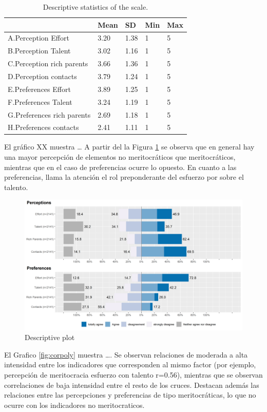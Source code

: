 \documentclass[
]{article}
\begin{document}
\begin{table}[!h]

\caption{\label{tab:desc01}Descriptive statistics of the scale.}
\centering
\fontsize{10}{12}\selectfont
\begin{tabular}[t]{lllll}
\toprule
  & Mean & SD & Min & Max\\
\midrule
A.Perception Effort & 3.20 & 1.38 & 1 & 5\\
B.Perception Talent & 3.02 & 1.16 & 1 & 5\\
C.Perception rich parents & 3.66 & 1.36 & 1 & 5\\
D.Perception contacts & 3.79 & 1.24 & 1 & 5\\
E.Preferences Effort & 3.89 & 1.25 & 1 & 5\\
F.Preferences Talent & 3.24 & 1.19 & 1 & 5\\
G.Preferences rich parents & 2.69 & 1.18 & 1 & 5\\
H.Preferences contacts & 2.41 & 1.11 & 1 & 5\\
\bottomrule
\end{tabular}
\end{table}

El gráfico XX muestra \ldots{}
A partir del la Figura \ref{fig:plotlikert} se observa que en general hay una mayor percepción de elementos no meritocráticos que meritocráticos, mientras que en el caso de preferencias ocurre lo opuesto. En cuanto a las preferencias, llama la atención el rol preponderante del esfuerzo por sobre el talento.

\begin{figure}[H]

{\centering \includegraphics[width=0.75\linewidth]{../output/images/plotlikert} 

}

\caption{Descriptive plot}\label{fig:plotlikert}
\end{figure}

El Grafico \ref{fig:corpoly} muestra \ldots.
Se observan relaciones de moderada a alta intensidad entre los indicadores que corresponden al mismo factor (por ejemplo, percepción de meritocracia esfuerzo con talento r=0.56), mientras que se observan correlaciones de baja intensidad entre el resto de los cruces. Destacan además las relaciones entre las percepciones y preferencias de tipo meritocráticas, lo que no ocurre con los indicadores no meritocraticos.
\end{document}

